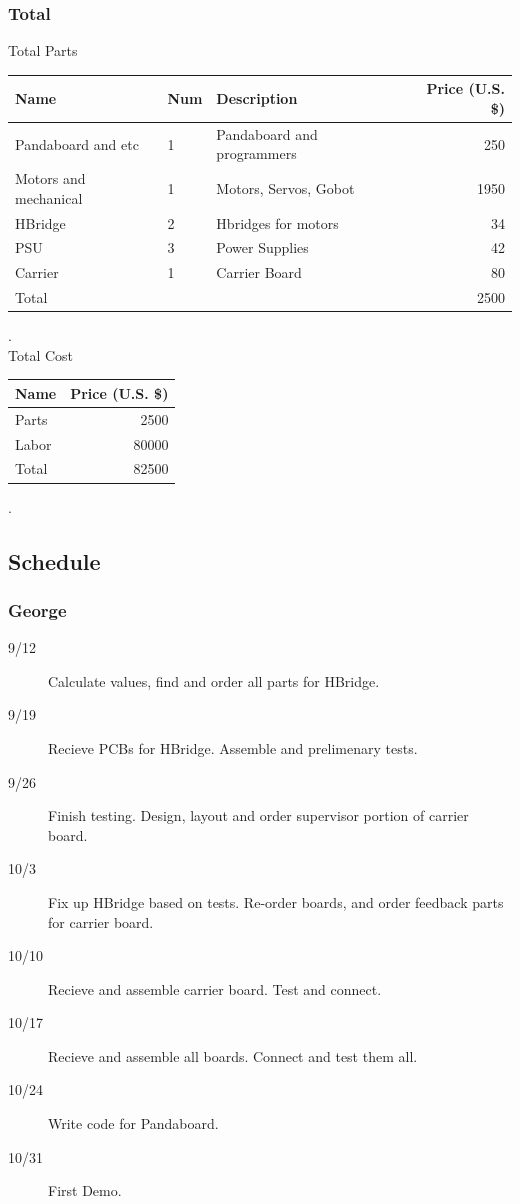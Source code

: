 \documentclass[12pt]{article}
\begin{document}
 \subsubsection{Total}
Total Parts\\
\begin{tabular}{| l || l | l |r | }
  \hline                       
     Name &Num &Description & Price (U.S. \$) \\ \hline
     Pandaboard and etc &1& Pandaboard and programmers & 250\\
     Motors and mechanical&1& Motors, Servos, Gobot & 1950\\
     HBridge&2&Hbridges for motors&34\\
     PSU&3&Power Supplies&42\\
     Carrier&1&Carrier Board&80\\ \hline
     Total  &&&2500\\
   \hline  
   \end{tabular}.\\

Total Cost\\
\begin{tabular}{| l || r | }
  \hline                       
     Name & Price (U.S. \$) \\ \hline
     Parts & 2500 \\
     Labor & 80000 \\ \hline 
     Total  &82500\\\hline  
   \end{tabular}.\\
 
 \subsection{Schedule}
 \subsubsection{George}
 \begin{description}
  \item[9/12] Calculate values, find and order all parts for HBridge.
  \item[9/19] Recieve PCBs for HBridge. Assemble and prelimenary tests.
  \item[9/26] Finish testing.  Design, layout and order supervisor portion of carrier board.
  \item[10/3] Fix up HBridge based on tests. Re-order boards, and order feedback parts for carrier board.
  \item[10/10] Recieve and assemble carrier board. Test and connect.
  \item[10/17] Recieve and assemble all boards. Connect and test them all.
  \item[10/24] Write code for Pandaboard.
  \item[10/31] First Demo.
\end{description}
\end{document}
